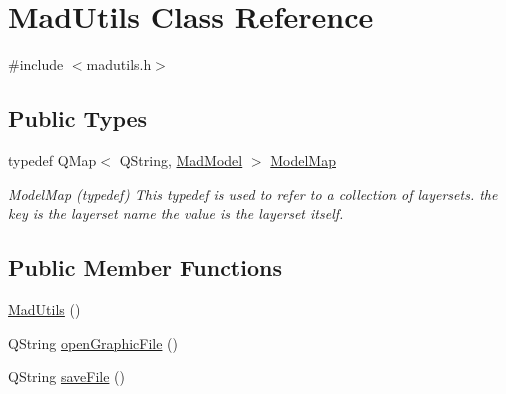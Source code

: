 \hypertarget{class_mad_utils}{\section{Mad\-Utils Class Reference}
\label{class_mad_utils}
}


{\ttfamily \#include $<$madutils.\-h$>$}

\subsection*{Public Types}
\begin{DoxyCompactItemize}
\item 
typedef Q\-Map$<$ Q\-String, \hyperlink{class_mad_model}{Mad\-Model} $>$ \hyperlink{class_mad_utils_a6bec5016d103cb2712d7bd2001c55b3b}{Model\-Map}
\begin{DoxyCompactList}\small\item\em Model\-Map (typedef) This typedef is used to refer to a collection of layersets. the key is the layerset name the value is the layerset itself. \end{DoxyCompactList}\end{DoxyCompactItemize}
\subsection*{Public Member Functions}
\begin{DoxyCompactItemize}
\item 
\hyperlink{class_mad_utils_a1a74572145ae5f7f6680896bb8fccb0e}{Mad\-Utils} ()
\item 
Q\-String \hyperlink{class_mad_utils_a5c0a97189ce985a39dcd3f3c6882418f}{open\-Graphic\-File} ()
\item 
Q\-String \hyperlink{class_mad_utils_ab4c61234d51b19693917dd0551ad744c}{save\-File} ()
\end{DoxyCompactItemize}
